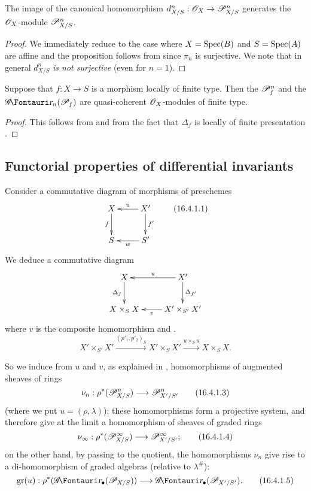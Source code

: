 \begin{proposition}[16.3.8]
\label{IV.16.3.8}
The image of the canonical homomorphism $d_{X/S}^n: \sh{O}_X \to \sh{P}_{X/S}^n$ generates the $\mathscr{O}_X$-module $\mathscr{P}_{X/S}^n$.
\end{proposition}

\begin{proof}
We immediately reduce to the case where $X = \operatorname{Spec}(B)$ and $S = \operatorname{Spec}(A)$ are affine and the proposition follows from  since $\pi_n$ is surjective.
We note that in general $d_{X/S}^n$ \emph{is not surjective} (even for $n = 1$).
\end{proof}

\begin{proposition}[16.3.9]
\label{IV.16.3.9}
Suppose that $f:X \to S$ is a morphism locally of finite type.
Then the $\mathscr{P}_{f}^n$ and the $\shGr_n(\sh{P}_{f})$ are quasi-coherent $\mathscr{O}_X$-modules of finite type.
\end{proposition}

\begin{proof}
This follows from  and from the fact that $\Delta_f$ is locally of finite presentation .
\end{proof}

\subsection{Functorial properties of differential invariants}
\label{IV.16.4}

\begin{env}[16.4.1]
\label{IV.16.4.1}
Consider a commutative diagram of morphisms of preschemes
\[
  \label{IV.16.4.1.1}
  \xymatrix{
    X \ar[d]_-{f} & X' \ar[l]_-u \ar[d]^-{f'}\\
    S & S' \ar[l]^-w
  }
  \tag{16.4.1.1}
\]
We deduce a commutative diagram
\[
  \xymatrix{
    X \ar[d]_-{\Delta_f} & X' \ar[l]_-u \ar[d]^-{\Delta_{f'}}\\
    X \times_S X & X' \times_{S'} X' \ar[l]^-v
  }
\]
where $v$ is the composite homomorphism  and .
\[
  \label{IV.16.4.1.2}
  X' \times_{S'} X' \xrightarrow{(p'_1, p'_2)_S} X' \times_{S} X' \xrightarrow{u \times_S u} X \times_S X.
  \tag{16.4.1.2}
\]

So we induce from $u$ and $v$, as explained in , homomorphisms of augmented sheaves of rings
\[
  \label{IV.16.4.1.3}
  \nu_n: \rho^*(\sh{P}_{X/S}^n) \to \sh{P}_{X'/S'}^n
  \tag{16.4.1.3}
\]
(where we put $u = (\rho,\lambda)$);
these homomorphisms form a projective system, and therefore give at the limit a homomorphism of sheaves of graded rings
\[
  \label{IV.16.4.1.4}
  \nu_\infty: \rho^*(\sh{P}_{X/S}^\infty) \to \sh{P}_{X'/S'}^\infty;
  \tag{16.4.1.4}
\]
on the other hand, by passing to the quotient, the homomorphisms $\nu_n$ give rise to a di-homomorphism of graded algebras (relative to $\lambda^\#$):
\[
  \label{IV.16.4.1.5}
  \gr(u): \rho^*(\shGr_\bullet(\sh{P}_{X/S})) \to \shGr_\bullet(\sh{P}_{X'/S'}).
  \tag{16.4.1.5}
\]
\end{env}

